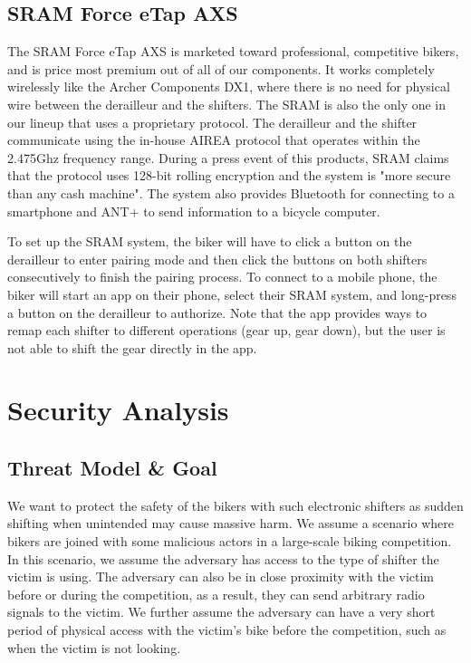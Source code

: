 \documentclass[letterpaper,twocolumn,10pt]{article}
\begin{document}
\subsection{SRAM Force eTap AXS}
The SRAM Force eTap AXS \cite{etap} is marketed toward professional, competitive bikers, and is price most premium out of all of our components. It works completely wirelessly like the Archer Components DX1, where there is no need for physical wire between the derailleur and the shifters. The SRAM is also the only one in our lineup that uses a proprietary protocol. The derailleur and the shifter communicate using the in-house AIREA protocol that operates within the 2.475Ghz frequency range. During a press event of this products, SRAM claims that  the protocol uses 128-bit rolling encryption and the system is "more secure than any cash machine".\cite{phillips2015SRAM} The system also provides Bluetooth for connecting to a smartphone and ANT+ to send information to a bicycle computer.

To set up the SRAM system, the biker will have to click a button on the derailleur to enter pairing mode and then click the buttons on both shifters consecutively to finish the pairing process. To connect to a mobile phone, the biker will start an app on their phone, select their SRAM system, and long-press a button on the derailleur to authorize. Note that the app provides ways to remap each shifter to different operations (gear up, gear down), but the user is not able to shift the gear directly in the app.




\section{Security Analysis}



\subsection{Threat Model \& Goal}
We want to protect the safety of the bikers with such electronic shifters as sudden shifting when unintended may cause massive harm. We assume a scenario where bikers are joined with some malicious actors in a large-scale biking competition. In this scenario, we assume the adversary has access to the type of shifter the victim is using. The adversary can also be in close proximity with the victim before or during the competition, as a result, they can send arbitrary radio signals to the victim. We further assume the adversary can have a very short period of physical access with the victim's bike before the competition, such as when the victim is not looking.
\end{document}
